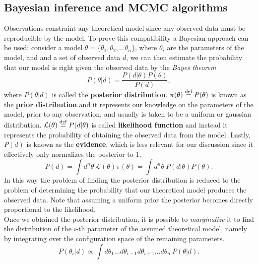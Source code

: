 \subsection{Bayesian inference and MCMC algorithms}
Observations constraint any theoretical model since any observed data must be reproducible by the model. To prove this compatibility a Bayesian approach can be used: consider a model $\theta=\{\theta_1,\theta_2,\dots\theta_n\}$, where $\theta_i$ are the parameters of the model, and and a set of observed data $d$, we can then estimate the probability that our model is right given the observed data by the \emph{Bayes theorem}
\begin{equation}
    P(\theta|d)=\frac{P(d|\theta)P(\theta)}{P(d)},
\end{equation}
where $P(\theta|d)$ is called the \textbf{posterior distribution}. $\pi(\theta)\stackrel{\text{def}}{=} P(\theta)$ is known as the \textbf{prior distribution} and it represents our knowledge on the parameters of the model, prior to any observation, and usually is taken to be a uniform or gaussian distribution.  $\mathcal{L}(\theta)\stackrel{\text{def}}{=} P(d|\theta)$ is called \textbf{likelihood function} and instead it represents the probability of obtaining the observed data from the model. Lastly, $P(d)$ is known as the \textbf{evidence}, which is less relevant for our discussion since it effectively only normalizes the posterior to 1, 
$$P(d)=\int d^n\theta\ \mathcal{L}(\theta)\pi(\theta)=\int d^n\theta\ P(d|\theta)P(\theta).$$
In this way the problem of finding the posterior distribution is reduced to the problem of determining the probability that our theoretical model produces the observed data. Note that assuming a uniform prior the posterior becomes directly proportional to the likelihood.\\ 
Once we obtained the posterior distribution, it is possible to \emph{marginalize} it to find the distribution of the $i$-th parameter of the assumed theoretical model, namely by integrating over the configuration space of the remaining parameters.
$$P(\theta_i|d)\propto\int d\theta_1\dots d\theta_{i-1}d\theta_{i+1}\dots d\theta_n\ P(\theta|d). $$

